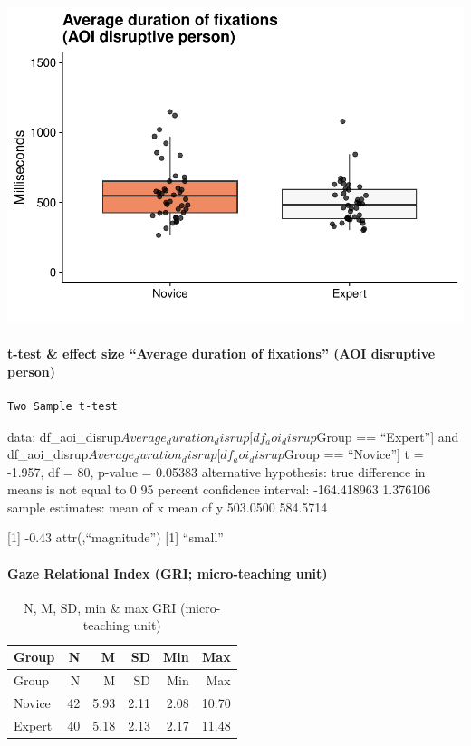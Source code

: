 \documentclass[
]{article}
\begin{document}
\includegraphics{expertise_2024_09_26_no_outlierdetection_MK_files/figure-latex/dur_disrup-1.pdf}

\paragraph{t-test \& effect size ``Average duration of fixations'' (AOI
disruptive
person)}\label{t-test-effect-size-average-duration-of-fixations-aoi-disruptive-person}

\begin{verbatim}
Two Sample t-test
\end{verbatim}

data: df\_aoi\_disrup\(Average_duration_disrup[df_aoi_disrup\)Group ==
``Expert''{]} and
df\_aoi\_disrup\(Average_duration_disrup[df_aoi_disrup\)Group ==
``Novice''{]} t = -1.957, df = 80, p-value = 0.05383 alternative
hypothesis: true difference in means is not equal to 0 95 percent
confidence interval: -164.418963 1.376106 sample estimates: mean of x
mean of y 503.0500 584.5714

{[}1{]} -0.43 attr(,``magnitude'') {[}1{]} ``small''

\paragraph{Gaze Relational Index (GRI; micro-teaching
unit)}\label{gaze-relational-index-gri-micro-teaching-unit}

\begin{longtable}[]{@{}lrrrrr@{}}
\caption{N, M, SD, min \& max GRI (micro-teaching unit)}\tabularnewline
\toprule\noalign{}
Group & N & M & SD & Min & Max \\
\midrule\noalign{}
\endfirsthead
\toprule\noalign{}
Group & N & M & SD & Min & Max \\
\midrule\noalign{}
\endhead
\bottomrule\noalign{}
\endlastfoot
Novice & 42 & 5.93 & 2.11 & 2.08 & 10.70 \\
Expert & 40 & 5.18 & 2.13 & 2.17 & 11.48 \\
\end{longtable}
\end{document}
